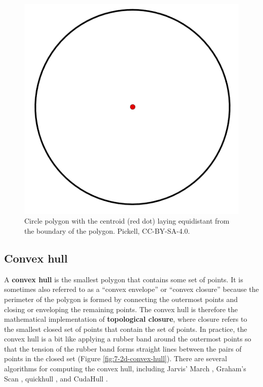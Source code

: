 \documentclass[
]{book}
\begin{document}
\begin{figure}
\includegraphics[width=0.5\linewidth]{images/07-circle-polygon-centroid} \caption{Circle polygon with the centroid (red dot) laying equidistant from the boundary of the polygon. Pickell, CC-BY-SA-4.0.}\label{fig:7-circle-polygon-centroid}
\end{figure}

\hypertarget{convex-hull}{%
\subsection{Convex hull}\label{convex-hull}}

A \textbf{convex hull} is the smallest polygon that contains some set of points. It is sometimes also referred to as a ``convex envelope'' or ``convex closure'' because the perimeter of the polygon is formed by connecting the outermost points and closing or enveloping the remaining points. The convex hull is therefore the mathematical implementation of \textbf{topological closure}, where closure refers to the smallest closed set of points that contain the set of points. In practice, the convex hull is a bit like applying a rubber band around the outermost points so that the tension of the rubber band forms straight lines between the pairs of points in the closed set (Figure \ref{fig:7-2d-convex-hull}). There are several algorithms for computing the convex hull, including Jarvis' March \citep{jarvis_identification_1973}, Graham's Scan \citep{graham_efficient_1972}, quickhull \citep{barber_quickhull_1996}, and CudaHull \citep{stein_cudahull_2012}.
\end{document}
